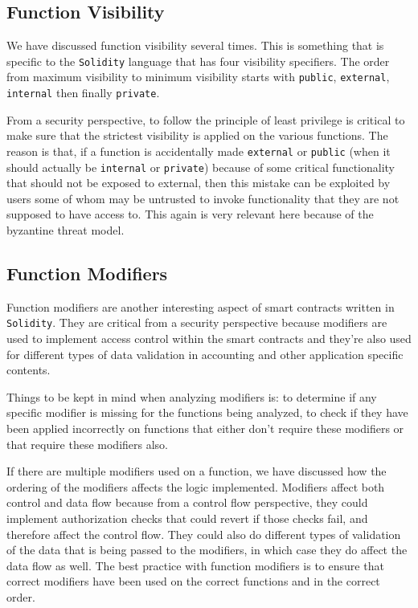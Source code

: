 \subsection{Function Visibility}\label{function-visibility}

We have discussed function visibility several times. This is something
that is specific to the \texttt{Solidity} language that has four
visibility specifiers. The order from maximum visibility to minimum
visibility starts with \texttt{public}, \texttt{external},
\texttt{internal} then finally \texttt{private}.

From a security perspective, to follow the principle of least privilege
is critical to make sure that the strictest visibility is applied on the
various functions. The reason is that, if a function is accidentally
made \texttt{external} or \texttt{public} (when it should actually be
\texttt{internal} or \texttt{private}) because of some critical
functionality that should not be exposed to external, then this mistake
can be exploited by users some of whom may be untrusted to invoke
functionality that they are not supposed to have access to. This again
is very relevant here because of the byzantine threat model.

\subsection{Function Modifiers}\label{function-modifiers}

Function modifiers are another interesting aspect of smart contracts
written in \texttt{Solidity}. They are critical from a security
perspective because modifiers are used to implement access control
within the smart contracts and they're also used for different types of
data validation in accounting and other application specific contents.

Things to be kept in mind when analyzing modifiers is: to determine if
any specific modifier is missing for the functions being analyzed, to
check if they have been applied incorrectly on functions that either
don't require these modifiers or that require these modifiers also.

If there are multiple modifiers used on a function, we have discussed
how the ordering of the modifiers affects the logic implemented.
Modifiers affect both control and data flow because from a control flow
perspective, they could implement authorization checks that could revert
if those checks fail, and therefore affect the control flow. They could
also do different types of validation of the data that is being passed
to the modifiers, in which case they do affect the data flow as well.
The best practice with function modifiers is to ensure that correct
modifiers have been used on the correct functions and in the correct
order.

